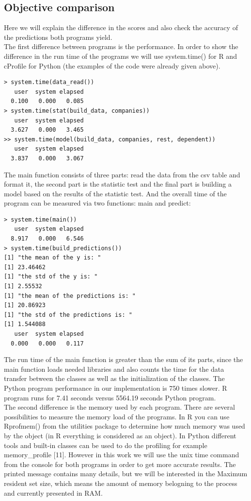 \documentclass[
  twoside,
  12pt, a4paper,
  footinclude=true,
  headinclude=true,
  cleardoublepage=empty
]{article}
\begin{document}
\subsection{Objective comparison}
Here we will explain the difference in the scores and also check the accuracy of the predictions both programs yield.\\
The first difference between programs is the performance. In order to show the difference in the run time of the programs we will use system.time() for R and cProfile for Python (the examples of the code were already given above).
\begin{verbatim}
> system.time(data_read())                                                                  
   user  system elapsed                                                                       
  0.100   0.000   0.085  
> system.time(stat(build_data, companies))
   user  system elapsed 
  3.627   0.000   3.465
>> system.time(model(build_data, companies, rest, dependent))
   user  system elapsed 
  3.837   0.000   3.067 
\end{verbatim}
The main function consists of three parts: read the data from the csv table and format it, the second part is the statistic test and the final part is building a model based on the results of the statistic test. And the overall time of the program can be measured via two functions: main and predict:
\begin{verbatim}
> system.time(main())
   user  system elapsed 
  8.917   0.000   6.546 
> system.time(build_predictions())
[1] "the mean of the y is: "
[1] 23.46462
[1] "the std of the y is: "
[1] 2.55532
[1] "the mean of the predictions is: "
[1] 20.86923
[1] "the std of the predictions is: "
[1] 1.544088
   user  system elapsed 
  0.000   0.000   0.117 
\end{verbatim}
The run time of the main function is greater than the sum of its parts, since the main function loads needed libraries and also counts the time for the data transfer between the classes as well as the initialization of the classes. The Python program performance in our implementation is 750 times slower. R program runs for 7.41 seconds versus 5564.19 seconds Python program.\\
The second difference is the memory used by each program. There are several possibilities to measure the memory load of the programs. In R you can use Rprofmem() from the utilities package to determine how much memory was used by the object (in R everything is considered as an object). In Python different tools and built-in classes can be used to do the profiling for example memory\_profile [11]. However in this work we will use the unix time command from the console for both programs in order to get more accurate results. The printed message contains many details, but we will be interested in the Maximum resident set size, which means the amount of memory belogning to the process and currently presented in RAM.\\ 
\end{document}
